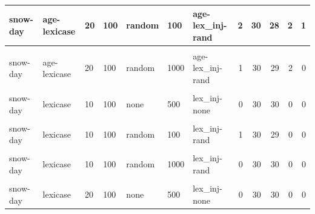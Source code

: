 \documentclass[
]{book}
\begin{document}
\begin{table}
\begin{tabular}{l|l|l|l|l|l|l|r|r|r|r|r}
\hline
snow-day & age-lexicase & 20 & 100 & random & 100 & age-lex\_inj-rand & 2 & 30 & 28 & 2 & 1\\
\hline
\cellcolor{gray!6}{snow-day} & \cellcolor{gray!6}{age-lexicase} & \cellcolor{gray!6}{20} & \cellcolor{gray!6}{100} & \cellcolor{gray!6}{random} & \cellcolor{gray!6}{500} & \cellcolor{gray!6}{age-lex\_inj-rand} & \cellcolor{gray!6}{1} & \cellcolor{gray!6}{30} & \cellcolor{gray!6}{29} & \cellcolor{gray!6}{4} & \cellcolor{gray!6}{0}\\
\hline
snow-day & age-lexicase & 20 & 100 & random & 1000 & age-lex\_inj-rand & 1 & 30 & 29 & 2 & 0\\
\hline
\cellcolor{gray!6}{snow-day} & \cellcolor{gray!6}{lexicase} & \cellcolor{gray!6}{10} & \cellcolor{gray!6}{100} & \cellcolor{gray!6}{none} & \cellcolor{gray!6}{100} & \cellcolor{gray!6}{lex\_inj-none} & \cellcolor{gray!6}{0} & \cellcolor{gray!6}{30} & \cellcolor{gray!6}{30} & \cellcolor{gray!6}{0} & \cellcolor{gray!6}{0}\\
\hline
snow-day & lexicase & 10 & 100 & none & 500 & lex\_inj-none & 0 & 30 & 30 & 0 & 0\\
\hline
\cellcolor{gray!6}{snow-day} & \cellcolor{gray!6}{lexicase} & \cellcolor{gray!6}{10} & \cellcolor{gray!6}{100} & \cellcolor{gray!6}{none} & \cellcolor{gray!6}{1000} & \cellcolor{gray!6}{lex\_inj-none} & \cellcolor{gray!6}{0} & \cellcolor{gray!6}{30} & \cellcolor{gray!6}{30} & \cellcolor{gray!6}{0} & \cellcolor{gray!6}{0}\\
\hline
snow-day & lexicase & 10 & 100 & random & 100 & lex\_inj-rand & 1 & 30 & 29 & 0 & 0\\
\hline
\cellcolor{gray!6}{snow-day} & \cellcolor{gray!6}{lexicase} & \cellcolor{gray!6}{10} & \cellcolor{gray!6}{100} & \cellcolor{gray!6}{random} & \cellcolor{gray!6}{500} & \cellcolor{gray!6}{lex\_inj-rand} & \cellcolor{gray!6}{3} & \cellcolor{gray!6}{30} & \cellcolor{gray!6}{27} & \cellcolor{gray!6}{0} & \cellcolor{gray!6}{0}\\
\hline
snow-day & lexicase & 10 & 100 & random & 1000 & lex\_inj-rand & 0 & 30 & 30 & 0 & 0\\
\hline
\cellcolor{gray!6}{snow-day} & \cellcolor{gray!6}{lexicase} & \cellcolor{gray!6}{20} & \cellcolor{gray!6}{100} & \cellcolor{gray!6}{none} & \cellcolor{gray!6}{100} & \cellcolor{gray!6}{lex\_inj-none} & \cellcolor{gray!6}{0} & \cellcolor{gray!6}{30} & \cellcolor{gray!6}{30} & \cellcolor{gray!6}{0} & \cellcolor{gray!6}{0}\\
\hline
snow-day & lexicase & 20 & 100 & none & 500 & lex\_inj-none & 0 & 30 & 30 & 0 & 0\\

\end{tabular}
\end{table}
\end{document}
